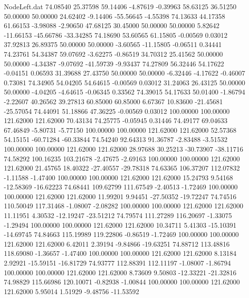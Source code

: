 \begin{filecontents}{NodeLeft.dat}
  74.08540   25.37598   59.14406    -4.87619   -0.39963   58.63125   36.51250   50.00000   50.00000   24.62402   -9.14406  -55.56645   -4.55398
  74.13633   44.17358   61.66153    -3.98088   -2.90650   47.68125   30.45000   50.00000   50.00000    5.82642  -11.66153  -45.66786  -33.34285
  74.18690   53.60565   61.15805    -0.00569    0.03012   37.92813   26.89375   50.00000   50.00000   -3.60565  -11.15805   -0.06511    0.34441
  74.23761   54.34387   59.07692    -3.62275   -0.86519   34.70312   25.41562   50.00000   50.00000   -4.34387   -9.07692  -41.59739   -9.93437
  74.27809   56.32446   54.17622    -0.04151    0.06593   31.39688   27.43750   50.00000   50.00000   -6.32446   -4.17622   -0.46007    0.73081
  74.34905   54.04205   54.64615    -0.00569    0.03012   31.24063   26.43125   50.00000   50.00000   -4.04205   -4.64615   -0.06345    0.33562
  74.39015   54.17633   50.01400    -1.86794   -2.22607   40.26562   39.27813   60.85000   60.85000    6.67367   10.83600  -21.45681  -25.57054
  74.44091   51.18866   47.36225    -0.00569    0.03012  100.00000  100.00000  121.62000  121.62000   70.43134   74.25775   -0.05945    0.31446
  74.49177   69.04633   67.46849    -5.80731   -5.77150  100.00000  100.00000  121.62000  121.62000   52.57368   54.15151  -60.71284  -60.33844
  74.54240   92.64313   91.36787    -2.83488   -3.51532  100.00000  100.00000  121.62000  121.62000   28.97688   30.25213  -30.73907  -38.11716
  74.58292  100.16235  103.21678    -2.47675   -2.69163  100.00000  100.00000  121.62000  121.62000   21.45765   18.40322  -27.40557  -29.78318
  74.63365  106.37207  112.07832    -1.11588   -1.47400  100.00000  100.00000  121.62000  121.62000   15.24793    9.54168  -12.58369  -16.62223
  74.68441  109.62799  111.67549    -2.40513   -1.72469  100.00000  100.00000  121.62000  121.62000   11.99201    9.94451  -27.50352  -19.72247
  74.74516  110.50049  117.31468    -1.08007   -2.08282  100.00000  100.00000  121.62000  121.62000   11.11951    4.30532  -12.19247  -23.51212
  74.79574  111.27289  116.20697    -1.33075   -1.29494  100.00000  100.00000  121.62000  121.62000   10.34711    5.41303  -15.10391  -14.69745
  74.84663  115.19989  119.22806    -0.86519   -1.72469  100.00000  100.00000  121.62000  121.62000    6.42011    2.39194   -9.84866  -19.63251
  74.88712  113.48816  118.69080    -1.36657   -1.47400  100.00000  100.00000  121.62000  121.62000    8.13184    2.92921  -15.59151  -16.81729
  74.93777  112.88391  112.11197    -1.08007   -1.86794  100.00000  100.00000  121.62000  121.62000    8.73609    9.50803  -12.33221  -21.32816
  74.98829  115.66986  120.10071    -0.82938   -1.00844  100.00000  100.00000  121.62000  121.62000    5.95014    1.51929   -9.48756  -11.53592

\end{filecontents}
